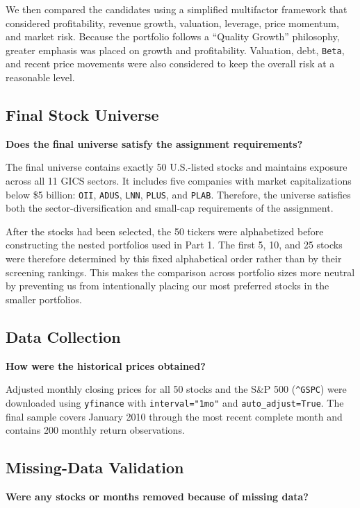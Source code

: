 \documentclass[11pt]{article}
\begin{document}
We then compared the candidates using a simplified multifactor framework that
considered profitability, revenue growth, valuation, leverage, price momentum,
and market risk. Because the portfolio follows a ``Quality Growth'' philosophy,
greater emphasis was placed on growth and profitability. Valuation, debt,
\texttt{Beta}, and recent price movements were also considered to keep the
overall risk at a reasonable level.

\subsection{Final Stock Universe}

\textbf{Does the final universe satisfy the assignment requirements?}

The final universe contains exactly 50 U.S.-listed stocks and maintains
exposure across all 11 GICS sectors. It includes five companies with market
capitalizations below \$5 billion: \texttt{OII}, \texttt{ADUS}, \texttt{LNN},
\texttt{PLUS}, and \texttt{PLAB}. Therefore, the universe satisfies both the
sector-diversification and small-cap requirements of the assignment.

After the stocks had been selected, the 50 tickers were alphabetized before
constructing the nested portfolios used in Part 1. The first 5, 10, and 25
stocks were therefore determined by this fixed alphabetical order rather than
by their screening rankings. This makes the comparison across portfolio sizes
more neutral by preventing us from intentionally placing our most preferred
stocks in the smaller portfolios.

\subsection{Data Collection}

\textbf{How were the historical prices obtained?}

Adjusted monthly closing prices for all 50 stocks and the S\&P 500
(\texttt{\^{}GSPC}) were downloaded using \texttt{yfinance} with
\texttt{interval="1mo"} and \texttt{auto\_adjust=True}. The final sample covers
January 2010 through the most recent complete month and contains 200 monthly
return observations.

\subsection{Missing-Data Validation}

\textbf{Were any stocks or months removed because of missing data?}
\end{document}
